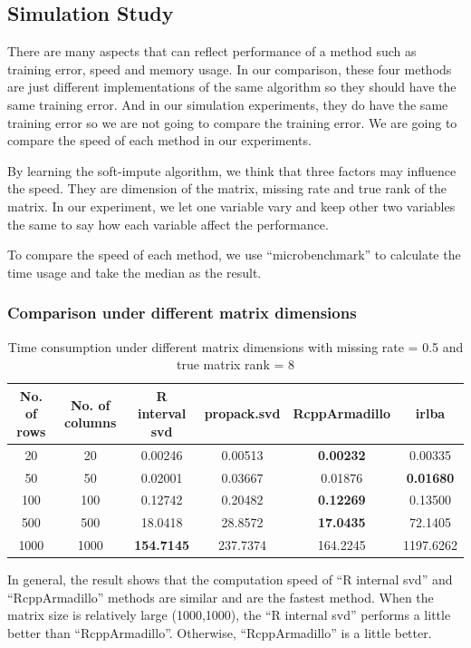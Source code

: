 \documentclass[12pt]{article}
\begin{document}
	\subsection{Simulation Study}
	
	There are many aspects that can reflect performance of a method such as training error, speed and memory usage. In our comparison, these four methods are just different implementations of the same algorithm so they should have the same training error. And in our simulation experiments, they do have the same training error so we are not going to compare the training error. We are going to compare the speed of each method in our experiments.
	
	By learning the soft-impute algorithm, we think that three factors may influence the speed. They are dimension of the matrix, missing rate and true rank of the matrix. In our experiment, we let one variable vary and keep other two variables the same to say how each variable affect the performance.
	
	To compare the speed of each method, we use “microbenchmark” to calculate the time usage and take the median as the result.
	
	\subsubsection{Comparison under different matrix dimensions}
	
\begin{table}[ht]
	\centering
	\caption{Time consumption under different matrix dimensions with missing rate = 0.5 and true matrix rank = 8 }\label{dimension}
	\begin{tabular}{cccccc}
		\hline\hline
	No. of rows & No. of columns & R interval svd & propack.svd & RcppArmadillo & irlba\\
	\hline
	20&20&0.00246&0.00513&\textbf{0.00232}&0.00335\\
	50&50&0.02001&0.03667&0.01876&\textbf{0.01680}\\
	100&100&0.12742&0.20482&\textbf{0.12269}&0.13500\\
	500&500&18.0418&28.8572&\textbf{17.0435}&72.1405\\
	1000&1000&\textbf{154.7145}&237.7374&164.2245&1197.6262\\
		\hline\hline
	\end{tabular}
\end{table}

In general, the result shows that the computation speed of “R internal svd” and “RcppArmadillo” methods are similar and are the fastest method. When the matrix size is relatively large (1000,1000), the “R internal svd” performs a little better than “RcppArmadillo”. Otherwise, “RcppArmadillo” is a little better.
\end{document}

